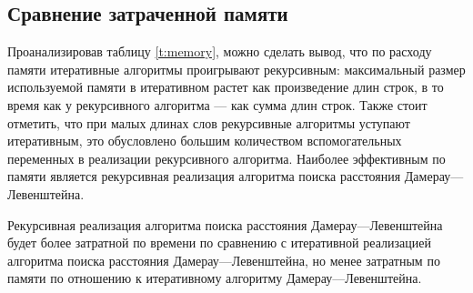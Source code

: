 \subsection{Сравнение затраченной памяти}

Проанализировав таблицу \ref{t:memory}, можно сделать вывод, что по расходу памяти итеративные алгоритмы 
проигрывают рекурсивным: максимальный размер используемой памяти в итеративном растет как произведение длин строк,
в то время как у рекурсивного алгоритма --- как сумма длин строк.
Также стоит отметить, что при малых длинах слов рекурсивные алгоритмы уступают итеративным, это обусловлено большим 
количеством вспомогательных переменных в реализации рекурсивного алгоритма. Наиболее эффективным по памяти является рекурсивная реализация алгоритма поиска расстояния Дамерау---Левенштейна.


Рекурсивная реализация алгоритма поиска расстояния Дамерау---Левенштейна будет более затратной по времени по сравнению с итеративной реализацией алгоритма поиска расстояния Дамерау---Левенштейна, но менее затратным по памяти по отношению к итеративному алгоритму Дамерау---Левенштейна.
